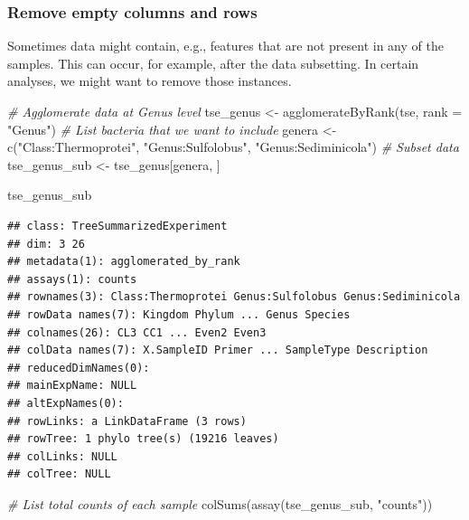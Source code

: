 \documentclass[
]{book}
\newenvironment{Shaded}{\begin{snugshade}}{\end{snugshade}}
\newcommand{\AttributeTok}[1]{\textcolor[rgb]{0.77,0.63,0.00}{#1}}
\newcommand{\CommentTok}[1]{\textcolor[rgb]{0.56,0.35,0.01}{\textit{#1}}}
\newcommand{\FunctionTok}[1]{\textcolor[rgb]{0.00,0.00,0.00}{#1}}
\newcommand{\NormalTok}[1]{#1}
\newcommand{\OtherTok}[1]{\textcolor[rgb]{0.56,0.35,0.01}{#1}}
\newcommand{\StringTok}[1]{\textcolor[rgb]{0.31,0.60,0.02}{#1}}
\begin{document}
\hypertarget{remove-empty-columns-and-rows}{%
\subsubsection{Remove empty columns and rows}\label{remove-empty-columns-and-rows}}

Sometimes data might contain, e.g., features that are not present in any of the samples.
This can occur, for example, after the data subsetting. In certain analyses, we might want to
remove those instances.

\begin{Shaded}
\begin{Highlighting}[]
\CommentTok{\# Agglomerate data at Genus level }
\NormalTok{tse\_genus }\OtherTok{\textless{}{-}} \FunctionTok{agglomerateByRank}\NormalTok{(tse, }\AttributeTok{rank =} \StringTok{"Genus"}\NormalTok{)}
\CommentTok{\# List bacteria that we want to include}
\NormalTok{genera }\OtherTok{\textless{}{-}} \FunctionTok{c}\NormalTok{(}\StringTok{"Class:Thermoprotei"}\NormalTok{, }\StringTok{"Genus:Sulfolobus"}\NormalTok{, }\StringTok{"Genus:Sediminicola"}\NormalTok{)}
\CommentTok{\# Subset data}
\NormalTok{tse\_genus\_sub }\OtherTok{\textless{}{-}}\NormalTok{ tse\_genus[genera, ]}

\NormalTok{tse\_genus\_sub}
\end{Highlighting}
\end{Shaded}

\begin{verbatim}
## class: TreeSummarizedExperiment 
## dim: 3 26 
## metadata(1): agglomerated_by_rank
## assays(1): counts
## rownames(3): Class:Thermoprotei Genus:Sulfolobus Genus:Sediminicola
## rowData names(7): Kingdom Phylum ... Genus Species
## colnames(26): CL3 CC1 ... Even2 Even3
## colData names(7): X.SampleID Primer ... SampleType Description
## reducedDimNames(0):
## mainExpName: NULL
## altExpNames(0):
## rowLinks: a LinkDataFrame (3 rows)
## rowTree: 1 phylo tree(s) (19216 leaves)
## colLinks: NULL
## colTree: NULL
\end{verbatim}

\begin{Shaded}
\begin{Highlighting}[]
\CommentTok{\# List total counts of each sample}
\FunctionTok{colSums}\NormalTok{(}\FunctionTok{assay}\NormalTok{(tse\_genus\_sub, }\StringTok{"counts"}\NormalTok{))}
\end{Highlighting}
\end{Shaded}
\end{document}
